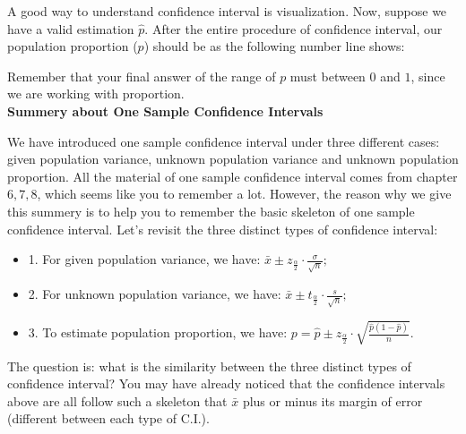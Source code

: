 \noindent
A good way to understand confidence interval is visualization. Now, suppose we have a valid estimation $\hat{p}$. After the entire procedure of confidence interval, our population proportion ($p$) should be as the following number line shows:\\

\begin{center}
\end{center}

\noindent
Remember that your final answer of the range of $p$ must between $0$ and $1$, since we are working with proportion.\\

\noindent
\textbf{Summery about One Sample Confidence Intervals}

\noindent
We have introduced one sample confidence interval under three different cases: given population variance, unknown population variance and unknown population proportion. All the material of one sample confidence interval comes from chapter $6, 7, 8$, which seems like you to remember a lot. However, the reason why we give this summery is to help you to remember the basic skeleton of one sample confidence interval. Let's revisit the three distinct types of confidence interval:

\begin{itemize}
	\item 1. For given population variance, we have: $\bar{x}  \pm z_{\frac{\alpha}{2}} \cdot \frac{\sigma}{\sqrt{n}};$
	\item 2. For unknown population variance, we have: $\bar{x}  \pm t_{\frac{\alpha}{2}} \cdot \frac{s}{\sqrt{n}};$
	\item 3. To estimate population proportion, we have: $p = \hat{p}  \pm z_{\frac{\alpha}{2}} \cdot \sqrt{\frac{\hat{p}(1 - \hat{p})}{n}}.$
\end{itemize}

\noindent
The question is: what is the similarity between the three distinct types of confidence interval? You may have already noticed that the confidence intervals above are all follow such a skeleton that $\bar{x}$ plus or minus its margin of error (different between each type of C.I.).\\ 

